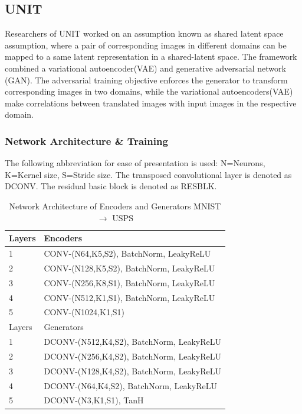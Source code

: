 \subsection{UNIT}
Researchers of UNIT\cite{DBLP:journals/corr/LiuBK17} worked on an assumption known as shared latent space assumption, where a pair of corresponding images in different domains can be mapped to a same latent representation in a shared-latent space. The framework combined a variational autoencoder(VAE) and generative adversarial network (GAN). The adversarial training objective enforces the generator to transform corresponding images in two domains, while the variational autoencoders(VAE) make correlations between translated images with input images in the respective domain.\\ 

\subsubsection{Network Architecture \& Training}
The following abbreviation for ease of presentation is used: N=Neurons, K=Kernel size, S=Stride size. The transposed convolutional layer is denoted as DCONV. The residual basic block is denoted as RESBLK.

\begin{table}[htbp]
\caption{Network Architecture of Encoders and Generators MNIST $\rightarrow$ USPS}
\label{UNIT}
\begin{tabular}{ll}
\hline
Layers & Encoders\\
\hline
\hline
1 & CONV-(N64,K5,S2), BatchNorm, LeakyReLU \\
2 & CONV-(N128,K5,S2), BatchNorm, LeakyReLU \\
3 & CONV-(N256,K8,S1), BatchNorm, LeakyReLU \\
4 & CONV-(N512,K1,S1), BatchNorm, LeakyReLU \\
5 & CONV-(N1024,K1,S1)\\
\hline
Layers & Generators \\
\hline
\hline
1 & DCONV-(N512,K4,S2), BatchNorm, LeakyReLU \\
2 & DCONV-(N256,K4,S2), BatchNorm, LeakyReLU \\
3 & DCONV-(N128,K4,S2), BatchNorm, LeakyReLU \\
4 & DCONV-(N64,K4,S2), BatchNorm, LeakyReLU \\
5 & DCONV-(N3,K1,S1), TanH \\
\hline
\hline

\end{tabular}
\end{table}

